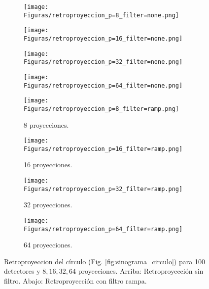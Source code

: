 \documentclass[letterpaper,12pt]{article}
\theoremstyle{plain}
\begin{document}
\begin{figure}[H]
   \centering
       \begin{subfigure}[h]{0.24\textwidth}
           \centering
           \texttt{[image: Figuras/retroproyeccion\_p=8\_filter=none.png]} 
       \end{subfigure}
       \begin{subfigure}[h]{0.24\textwidth}
           \centering
           \texttt{[image: Figuras/retroproyeccion\_p=16\_filter=none.png]}
       \end{subfigure}
       \begin{subfigure}[h]{0.24\textwidth}
           \centering
           \texttt{[image: Figuras/retroproyeccion\_p=32\_filter=none.png]}
       \end{subfigure}
       \begin{subfigure}[h]{0.24\textwidth}
           \centering
           \texttt{[image: Figuras/retroproyeccion\_p=64\_filter=none.png]}
       \end{subfigure}
        \begin{subfigure}[h]{0.24\textwidth}
           \centering
           \texttt{[image: Figuras/retroproyeccion\_p=8\_filter=ramp.png]}
           \caption{8 proyecciones.} 
        \end{subfigure}
        \begin{subfigure}[h]{0.24\textwidth}
           \centering
           \texttt{[image: Figuras/retroproyeccion\_p=16\_filter=ramp.png]}
           \caption{16 proyecciones.} 
        \end{subfigure}
        \begin{subfigure}[h]{0.24\textwidth}
           \centering
           \texttt{[image: Figuras/retroproyeccion\_p=32\_filter=ramp.png]}
           \caption{32 proyecciones.} 
        \end{subfigure}
        \begin{subfigure}[h]{0.24\textwidth}
           \centering
           \texttt{[image: Figuras/retroproyeccion\_p=64\_filter=ramp.png]}
           \caption{64 proyecciones.} 
        \end{subfigure}
   \caption{Retroproyeccion del círculo (Fig. \ref{fig:sinograma_circulo}) para 100 detectores y $8,16,32,64$ proyecciones. Arriba: Retroproyección sin filtro. Abajo: Retroproyección con filtro rampa.}
   \label{fig:retroproyeccion_circulo}
\end{figure}
\end{document}
